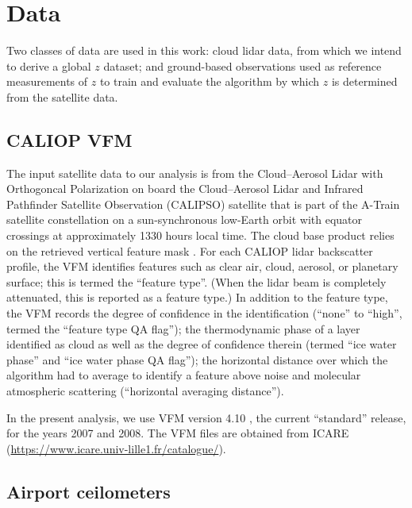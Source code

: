\documentclass[essd,manuscript]{copernicus}\usepackage[]{graphicx}\usepackage[]{color}
\newcommand\CBH{\ensuremath{z}}
\begin{document}
\section{Data}
\label{sec:data}

Two classes of data are used in this work: cloud lidar data, from which we
intend to derive a global \CBH{} dataset; and ground-based observations used as
reference measurements of \CBH{} to train and evaluate the algorithm by which
\CBH{} is determined from the satellite data.

\subsection{CALIOP VFM}

The input satellite data to our analysis is from the Cloud--Aerosol Lidar with
Orthogoncal Polarization \citep[CALIOP,][]{Winker2007} on board the Cloud--Aerosol Lidar and Infrared Pathfinder
Satellite Observation (CALIPSO) satellite that is part of the A-Train
satellite constellation \citep{Stephens2002} on a
sun-synchronous low-Earth orbit with equator crossings at approximately 1330 hours local
time. The cloud base product relies on the retrieved vertical feature mask
\citep[VFM,][]{vaughan2002}.  For each CALIOP lidar backscatter profile, the VFM identifies features
such as clear air, cloud, aerosol, or planetary surface; this is termed the ``feature
type''.  (When the lidar beam is completely attenuated, this is reported as a
feature type.)  In addition to the feature type, the VFM records the degree of
confidence in the identification (``none'' to ``high'', termed the ``feature
type QA flag''); the thermodynamic phase of a layer identified as cloud as well
as the degree of confidence therein (termed ``ice water phase'' and ``ice water
phase QA flag''); the horizontal distance over which the algorithm had to
average to identify a feature above noise and molecular atmospheric scattering
(``horizontal averaging distance'').  

In the present analysis, we use VFM version 4.10 \citep{vfm}, the current
``standard'' release, for the years 2007 and 2008.  The VFM files are obtained
from ICARE (\url{https://www.icare.univ-lille1.fr/catalogue/}).

\subsection{Airport ceilometers}
\end{document}
